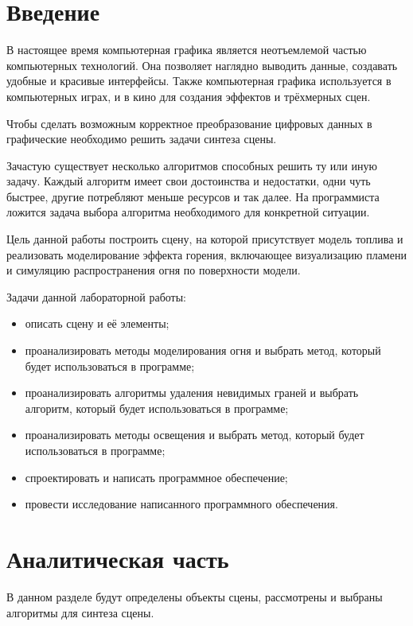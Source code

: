 \documentclass[a4paper,14pt]{report}
\begin{document}
\fontsize{14}{16pt}
\def\contentsname{Содержание}
%

\tableofcontents

\newpage
\chapter*{Введение}
В настоящее время компьютерная графика является неотъемлемой частью компьютерных технологий. Она позволяет наглядно выводить данные, создавать удобные и красивые интерфейсы. Также компьютерная графика используется в компьютерных играх, и в кино для создания эффектов и трёхмерных сцен.

Чтобы сделать возможным корректное преобразование цифровых данных в графические необходимо решить задачи синтеза сцены.
 
Зачастую существует несколько алгоритмов способных решить ту или иную задачу. Каждый алгоритм имеет свои достоинства и недостатки, одни чуть быстрее, другие потребляют меньше ресурсов и так далее. На программиста ложится задача выбора алгоритма необходимого для конкретной ситуации.

Цель данной работы построить сцену, на которой присутствует модель топлива и реализовать моделирование эффекта горения, включающее визуализацию пламени и симуляцию распространения огня по поверхности модели.


Задачи данной лабораторной работы:
\begin{itemize}
 \item описать сцену и её элементы;
 \item проанализировать методы моделирования огня и выбрать метод, который будет использоваться в программе;
 \item проанализировать алгоритмы удаления невидимых граней и выбрать алгоритм, который будет использоваться в программе;
 \item проанализировать методы освещения и выбрать метод, который будет использоваться в программе;
 \item спроектировать и написать программное обеспечение;
 \item провести исследование написанного программного обеспечения.
\end{itemize}


\chapter{Аналитическая часть}
В данном разделе будут определены объекты сцены, рассмотрены и выбраны алгоритмы для синтеза сцены.
\end{document}
